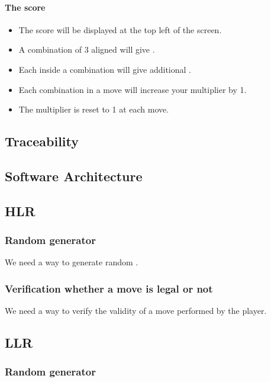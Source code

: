 \paragraph{The score}

\begin{itemize}
\item The score will be displayed at the top left of the screen.
\item A combination of 3 aligned \sqs will give \threepts \pts.
\item Each \sq inside a combination will give \sqpts additional \pts.
\item Each combination in a move will increase your multiplier by 1.
\item The multiplier is reset to 1 at each move.
\end{itemize}

\subsection{Traceability}

\subsection{Software Architecture}


\subsection{HLR}

\subsubsection{Random \sq generator}

We need a way to generate random \sqs.

\subsubsection{Verification whether a move is legal or not}

We need a way to verify the validity of a move performed by the player.

\subsection{LLR}

\subsubsection{Random \sq generator}

